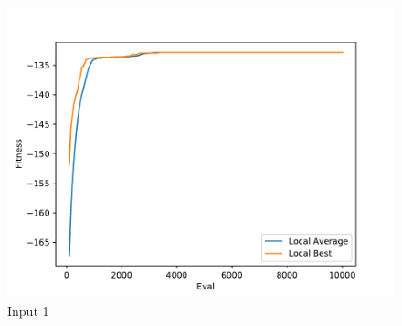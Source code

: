 \documentclass{standalone}
\begin{document}
\begin{figure}[!htb]
	\caption{Input 1}
	\label{fig:graph_1065}
	\includegraphics[width=\textwidth]{../graphs/graphs/1065.pdf}
\end{figure}
\end{document}
